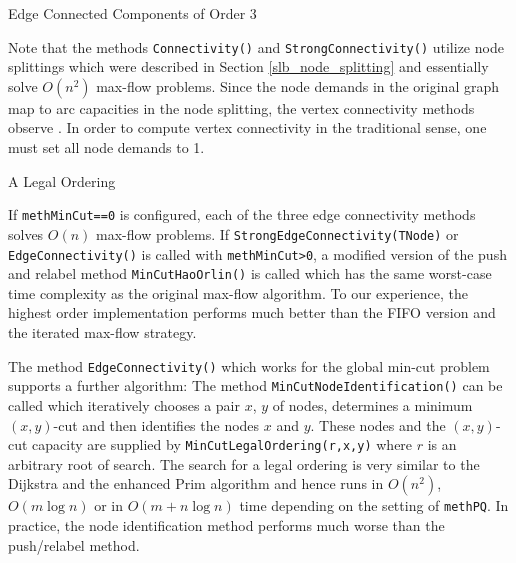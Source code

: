 \documentclass[a4paper,11pt,twoside]{book}
\begin{document}
\begin{multicols}{2}
\bigskip
\begin{figurehere}
\begin{center}
\epsfxsize=10cm
\vspace{0.5cm}
\caption{\label{flb_connect3}Edge Connected Components of Order 3}
\end{center}
\end{figurehere}

\noindent
Note that the methods \verb/Connectivity()/ and \verb/StrongConnectivity()/
utilize node splittings which were described in Section \ref{slb_node_splitting}
and essentially solve $O(n^2)$ max-flow problems. Since the node demands in the
original graph map to arc capacities in the node splitting, the vertex
connectivity methods observe . In order to compute vertex
connectivity in the traditional sense, one must set all node demands to 1.

\bigskip
\begin{figurehere}
\begin{center}
\epsfxsize=6.5cm
\vspace{0.5cm}
\caption{\label{flb_mincut1}A Legal Ordering}
\end{center}
\end{figurehere}

\noindent
If \verb/methMinCut==0/ is configured, each of the three edge connectivity
methods solves $O(n)$ max-flow problems. If \verb/StrongEdgeConnectivity(TNode)/
or \verb/EdgeConnectivity()/ is called with \verb/methMinCut>0/, a modified
version of the push and relabel method \verb/MinCutHaoOrlin()/ is called which
has the same worst-case time complexity as the original max-flow algorithm.
To our experience, the highest order implementation performs much better than
the FIFO version and the iterated max-flow strategy.

The method \verb/EdgeConnectivity()/ which works for the global min-cut problem
supports a further algorithm: The method \verb/MinCutNodeIdentification()/ can
be called which iteratively chooses a pair $x$, $y$ of nodes, determines a minimum $(x,y)$-cut and then identifies the
nodes $x$ and $y$. These nodes and the $(x,y)$-cut capacity are supplied by
\verb/MinCutLegalOrdering(r,x,y)/ where $r$ is an arbitrary root of search.
The search for a legal ordering is very similar to the Dijkstra and the
enhanced Prim algorithm and hence runs in $O(n^2)$, $O(m\log{n})$ or in
$O(m+n\log{n})$ time depending on the setting of \verb/methPQ/. In practice,
the node identification method performs much worse than the push/relabel method.



\end{multicols}
\end{document}
